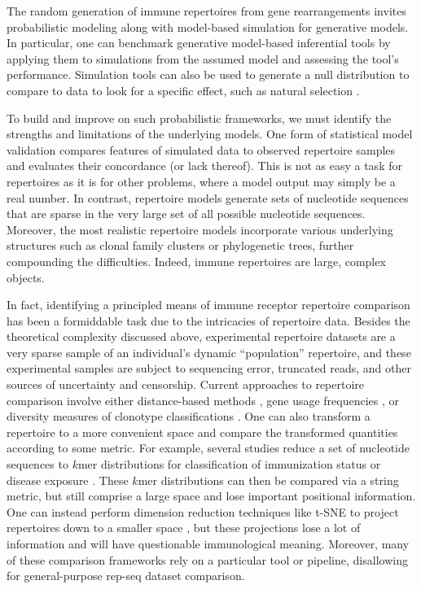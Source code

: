 \documentclass{article}
\begin{document}
The random generation of immune repertoires from gene rearrangements invites probabilistic modeling along with model-based simulation for generative models.
In particular, one can benchmark generative model-based inferential tools by applying them to simulations from the assumed model and assessing the tool's performance.
Simulation tools can also be used to generate a null distribution to compare to data to look for a specific effect, such as natural selection \cite{Yaari2012-kk}.

To build and improve on such probabilistic frameworks, we must identify the strengths and limitations of the underlying models.
One form of statistical model validation compares features of simulated data to observed repertoire samples and evaluates their concordance (or lack thereof).
This is not as easy a task for repertoires as it is for other problems, where a model output may simply be a real number.
In contrast, repertoire models generate sets of nucleotide sequences that are sparse in the very large set of all possible nucleotide sequences.
Moreover, the most realistic repertoire models incorporate various underlying structures such as clonal family clusters or phylogenetic trees, further compounding the difficulties.
Indeed, immune repertoires are large, complex objects.

In fact, identifying a principled means of immune receptor repertoire comparison has been a formiddable task due to the intricacies of repertoire data.
Besides the theoretical complexity discussed above, experimental repertoire datasets are a very sparse sample of an individual's dynamic ``population'' repertoire, and these experimental samples are subject to sequencing error, truncated reads, and other sources of uncertainty and censorship.
Current approaches to repertoire comparison involve either distance-based methods \cite{Dash2017-rz}, gene usage frequencies \cite{Hou2016-qc, Martin2015-ho, Corcoran2016-nw, Gadala2015-wq, Boyd2010-hd}, or diversity measures of clonotype classifications \cite{Aouinti2015-ke, Bischof2016-fn}.
One can also transform a repertoire to a more convenient space and compare the transformed quantities according to some metric.
For example, several studies reduce a set of nucleotide sequences to $k$mer distributions for classification of immunization status or disease exposure \cite{Madi2014-lt, Ostmeyer2017-xg, Heather2017pf}.
These $k$mer distributions can then be compared via a string metric, but still comprise a large space and lose important positional information.
One can instead perform dimension reduction techniques like t-SNE to project repertoires down to a smaller space \cite{Yokota2017-zm}, but these projections lose a lot of information and will have questionable immunological meaning.
Moreover, many of these comparison frameworks rely on a particular tool or pipeline, disallowing for general-purpose rep-seq dataset comparison.
\end{document}
